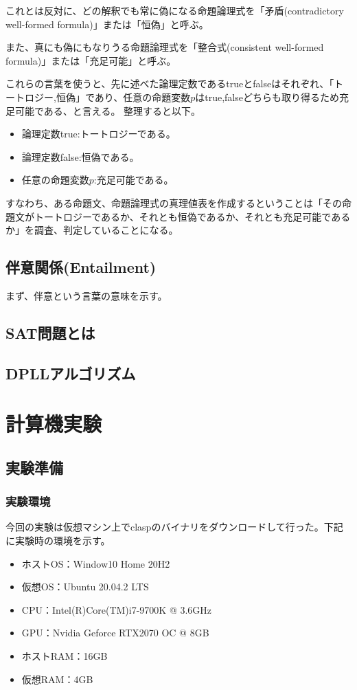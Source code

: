 \documentclass[dvipdfmx]{jsarticle}
\begin{document}
これとは反対に、どの解釈でも常に偽になる命題論理式を「矛盾(contradictory well-formed formula)」または「恒偽」と呼ぶ。\par
また、真にも偽にもなりうる命題論理式を「整合式(consistent well-formed formula)」または「充足可能」と呼ぶ。\par
これらの言葉を使うと、先に述べた論理定数であるtrueとfalseはそれぞれ、「トートロジー,恒偽」であり、任意の命題変数$p$はtrue,falseどちらも取り得るため充足可能である、と言える。
整理すると以下。
\begin{itemize}
  \item 論理定数true:トートロジーである。
  \item 論理定数false:恒偽である。
  \item 任意の命題変数$p$:充足可能である。
\end{itemize}
すなわち、ある命題文、命題論理式の真理値表を作成するということは「その命題文がトートロジーであるか、それとも恒偽であるか、それとも充足可能であるか」を調査、判定していることになる。
\subsection{伴意関係(Entailment)}
まず、伴意という言葉の意味を示す。





\subsection{SAT問題とは}
\subsection{DPLLアルゴリズム}
\section{計算機実験}
\subsection{実験準備}
  \subsubsection{実験環境}
  今回の実験は仮想マシン上でclaspのバイナリをダウンロードして行った。下記に実験時の環境を示す。
  \begin{itemize}
    \item ホストOS：Window10 Home 20H2
    \item 仮想OS：Ubuntu 20.04.2 LTS
    \item CPU：Intel(R)Core(TM)i7-9700K @ 3.6GHz
    \item GPU：Nvidia Geforce RTX2070 OC @ 8GB
    \item ホストRAM：16GB
    \item 仮想RAM：4GB
  \end{itemize}
\end{document}
